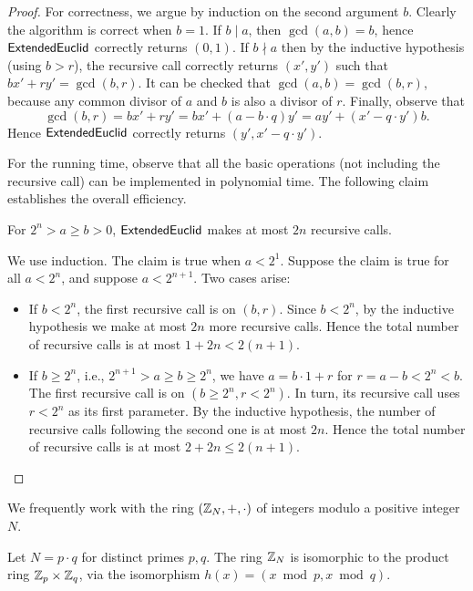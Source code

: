 \documentclass[11pt]{article}
\begin{document}
\begin{proof}
  For correctness, we argue by induction on the second argument $b$.
  Clearly the algorithm is correct when $b=1$.  If $b \mid a$, then
  $\gcd(a,b) = b$, hence $\mathsf{ExtendedEuclid}$ correctly returns $(0,1)$.  If
  $b \nmid a$ then by the inductive hypothesis (using $b > r$), the
  recursive call correctly returns $(x',y')$ such that $bx' + ry' =
  \gcd(b,r)$.  It can be checked that $\gcd(a,b) = \gcd(b,r)$, because
  any common divisor of $a$ and $b$ is also a divisor of $r$.
  Finally, observe that \[ \gcd(b,r) = bx' + ry' = bx' + (a - b \cdot
  q)y' = ay' + (x' - q \cdot y')b. \] Hence $\mathsf{ExtendedEuclid}$ correctly
  returns $(y', x' - q \cdot y')$.
  
  For the running time, observe that all the basic operations (not
  including the recursive call) can be implemented in polynomial
  time.  The following claim establishes the overall efficiency.
  
  \begin{claim}
    For $2^{n} > a \geq b > 0$, $\mathsf{ExtendedEuclid}$ makes at most $2n$
    recursive calls.
  \end{claim}

  We use induction.  The claim is true when $a < 2^{1}$.  Suppose the
  claim is true for all $a < 2^n$, and suppose $a < 2^{n+1}$.  Two
  cases arise:
  \begin{itemize}
  \item If $b < 2^n$, the first recursive call is on $(b, r)$.
    Since $b < 2^n$, by the inductive hypothesis we make at most
    $2n$ more recursive calls.  Hence the total number of recursive
    calls is at most $1 + 2n < 2(n+1)$.
  \item If $b \geq 2^n$, i.e., $2^{n+1} > a \geq b \geq 2^n$, we have
    $a = b \cdot 1 + r$ for $r = a-b < 2^n < b$.  The first recursive
    call is on $(b \geq 2^n, r < 2^n)$.  In turn, its recursive call
    uses $r < 2^n$ as its first parameter.  By the inductive
    hypothesis, the number of recursive calls following the second one
    is at most $2n$.  Hence the total number of recursive calls is at
    most $2 + 2n \leq 2(n+1)$. \qedhere
  \end{itemize}
\end{proof}

\noindent We frequently work with the ring $(\mathbb{Z}_N, +, \cdot)$ of
integers modulo a positive integer $N$.

\begin{lemma}
  Let $N = p \cdot q$ for distinct primes $p,q$.  The ring $\mathbb{Z}_N$ is
  isomorphic to the product ring $\mathbb{Z}_p \times \mathbb{Z}_q$, via the isomorphism
  $h(x) = (x \bmod p, x \bmod q)$.
\end{lemma}
\end{document}
